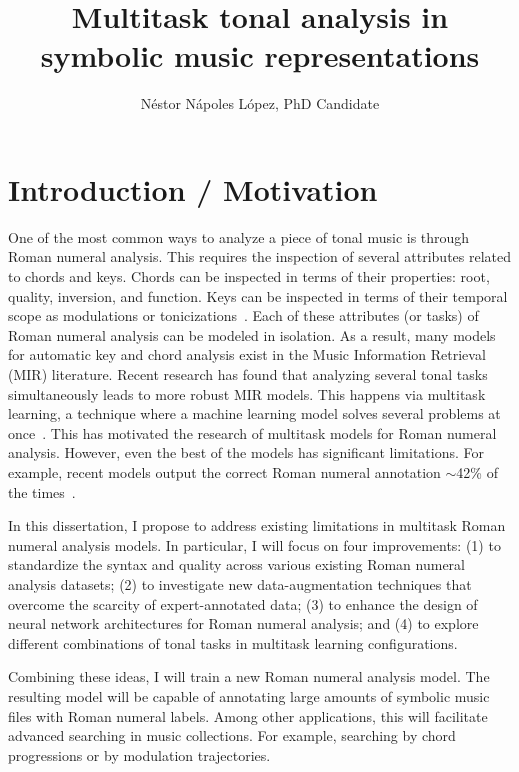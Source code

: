 \documentclass[12pt]{article}
\title{Multitask tonal analysis in symbolic music representations}
\author{N\'estor N\'apoles L\'opez, PhD Candidate}
\date{}
\newcommand{\guide}[1]{}
\begin{document}
\maketitle

\section*{Introduction / Motivation}

\guide{Problem}
One of the most common ways to analyze a piece of tonal music is through Roman numeral analysis.
This requires the inspection of several attributes related to chords and keys.
Chords can be inspected in terms of their properties: root, quality, inversion, and function.
Keys can be inspected in terms of their temporal scope as modulations or tonicizations~\cite{napoles_lopez_local_2020}.
Each of these attributes (or tasks) of Roman numeral analysis can be modeled in isolation.
As a result, many models for automatic key and chord analysis exist in the Music Information Retrieval (MIR) literature.
Recent research has found that analyzing several tonal tasks simultaneously leads to more robust MIR models.
This happens via multitask learning, a technique where a machine learning model solves several problems at once~\cite{ruder_overview_2017}.
This has motivated the research of multitask models for Roman numeral analysis.
However, even the best of the models has significant limitations.
For example, recent models output the correct Roman numeral annotation $\sim$42\% of the times~\cite{chen_attend_2021, micchi_not_2020}.

\guide{Proposal}
In this dissertation, I propose to address existing limitations in multitask Roman numeral analysis models.
In particular, I will focus on four improvements:
(1) to standardize the syntax and quality across various existing Roman numeral analysis datasets;
(2) to investigate new data-augmentation techniques that overcome the scarcity of expert-annotated data;
(3) to enhance the design of neural network architectures for Roman numeral analysis;
and (4) to explore different combinations of tonal tasks in multitask learning configurations.

Combining these ideas, I will train a new Roman numeral analysis model.
The resulting model will be capable of annotating large amounts of symbolic music files with Roman numeral labels.
Among other applications, this will facilitate advanced searching in music collections.
For example, searching by chord progressions or by modulation trajectories.
\end{document}
